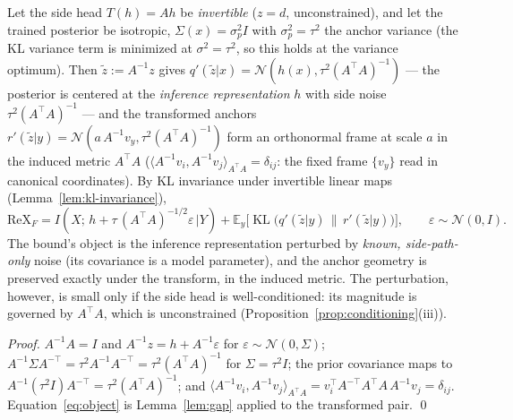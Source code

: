 \begin{proposition}\label{prop:inverse}
Let the side head $T(h) = Ah$ be \emph{invertible} ($z = d$, unconstrained), and let
the trained posterior be isotropic, $\Sigma(x) = \sigma_p^2 I$ with $\sigma_p^2 = \tau^2$
the anchor variance (the KL variance term is minimized at $\sigma^2 = \tau^2$, so this
holds at the variance optimum).
Then $\tilde z := A^{-1} z$ gives
$q'(\tilde z|x) = \mathcal{N}(h(x), \tau^2 (A^{\top}A)^{-1})$ --- the posterior is
centered at the \emph{inference representation} $h$ with side noise
$\tau^2 (A^{\top}A)^{-1}$ --- and the transformed anchors
$r'(\tilde z|y) = \mathcal{N}(a\, A^{-1} v_y, \tau^2 (A^{\top}A)^{-1})$ form an
orthonormal frame at scale $a$ in the induced metric $A^{\top}A$
($\langle A^{-1}v_i, A^{-1}v_j\rangle_{A^{\top}A} = \delta_{ij}$: the fixed frame
$\{v_y\}$ read in canonical coordinates). By KL invariance under invertible linear maps
(Lemma~\ref{lem:kl-invariance}),
\begin{equation}
\mathrm{ReX}_F
= I(X;\, h + \tau\,(A^{\top}A)^{-1/2}\varepsilon\,|Y)
+ \mathbb{E}_y\big[\operatorname{KL}\big(q'(\tilde z|y)\,\|\,r'(\tilde z|y)\big)\big],
\qquad \varepsilon \sim \mathcal{N}(0, I) .
\label{eq:object}
\end{equation}
The bound's object is the inference representation perturbed by \emph{known,
side-path-only} noise (its covariance is a model parameter), and the anchor geometry is
preserved exactly under the transform, in the induced metric. The perturbation,
however, is small only if the side head is well-conditioned: its magnitude is governed
by $A^{\top}A$, which is unconstrained
(Proposition~\ref{prop:conditioning}(iii)).
\end{proposition}

\begin{proof}
$A^{-1}A = I$ and $A^{-1} z = h + A^{-1}\varepsilon$ for $\varepsilon \sim
\mathcal{N}(0, \Sigma)$; $A^{-1}\Sigma A^{-\top} = \tau^2 A^{-1}A^{-\top}
= \tau^2 (A^{\top}A)^{-1}$ for $\Sigma = \tau^2 I$; the prior covariance maps to
$A^{-1} (\tau^2 I) A^{-\top} = \tau^2 (A^{\top}A)^{-1}$; and
$\langle A^{-1}v_i, A^{-1}v_j\rangle_{A^{\top}A}
= v_i^{\top} A^{-\top} A^{\top} A\, A^{-1} v_j = \delta_{ij}$.
Equation~\eqref{eq:object} is Lemma~\ref{lem:gap} applied to the transformed pair.
\hfill\qed
\end{proof}

